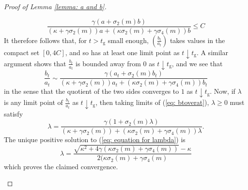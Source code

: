 \begin{proof}[Proof of Lemma \ref{lemma: a and b}]
\begin{enumerate}[label=\roman{*}).]
\begin{equation}
       \frac{\gamma( a+\sigma_2(m)b)}{(\kappa+\gamma \sigma_2(m))a+(\kappa \sigma_2(m)+\gamma\sigma_4(m))b}\le C
   \end{equation} It therefore follows that, for $t> t_\mathrm{g}$ small enough, $(\frac{b_t}{a_t})$ takes values in the compact set $[0,4C]$, and so has at least one limit point as $t\downarrow t_\mathrm{g}$. A similar argument shows that $\frac{b_t}{a_t}$ is bounded away from $0$ as $t\downarrow t_\mathrm{g}$, and we see that \begin{equation}\label{eq: btoverat}
        \frac{b_t}{a_t}\sim \frac{\gamma (a_t+\sigma_2(m)b_t)}{(\kappa+\gamma \sigma_2(m))a_t+(\kappa \sigma_2(m)+\gamma\sigma_4(m))b_t}
    \end{equation} in the sense that the quotient of the two sides converges to $1$ as $t\downarrow t_\mathrm{g}$. Now, if $\lambda$ is any limit point of $\frac{b_t}{a_t}$ as $t\downarrow t_\mathrm{g}$, then taking limits of (\ref{eq: btoverat}), $\lambda \ge 0$ must satisfy \begin{equation}\label{eq: equation for lambda}
        \lambda=\frac{\gamma(1 +\sigma_2(m)\lambda)}{(\kappa+\gamma \sigma_2(m))+(\kappa \sigma_2(m)+\gamma\sigma_4(m))\lambda}.
    \end{equation}The unique positive solution to (\ref{eq: equation for lambda}) is \begin{equation}
       \lambda=\frac{\sqrt{\kappa^2+4\gamma(\kappa\sigma_2(m)+\gamma \sigma_4(m))}-\kappa}{2(\kappa\sigma_2(m)+\gamma\sigma_4(m)}
    \end{equation} which proves the claimed convergence.
\end{enumerate}\end{proof}
